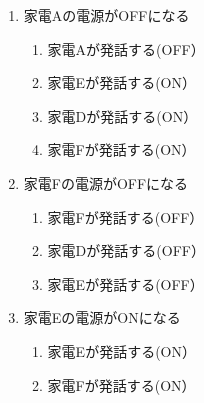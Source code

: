 \documentclass[a4j,12pt,twoside]{jreport}
\begin{document}
\begin{multicols}{2}
\begin{enumerate}
		\item 家電Aの電源がOFFになる
		\begin{enumerate}
			\item 家電Aが発話する(OFF）	
			\item 家電Eが発話する(ON）
			\item 家電Dが発話する(ON）
			\item 家電Fが発話する(ON）
		\end{enumerate}
		\item 家電Fの電源がOFFになる
		\begin{enumerate}
			\item 家電Fが発話する(OFF）
			\item 家電Dが発話する(OFF）
			\item 家電Eが発話する(OFF）
		\end{enumerate}
		
		\item 家電Eの電源がONになる
		\begin{enumerate}
			\item 家電Eが発話する(ON）
			\item 家電Fが発話する(ON）
		\end{enumerate}
	\end{enumerate}
\end{multicols}
\newpage
\end{document}
